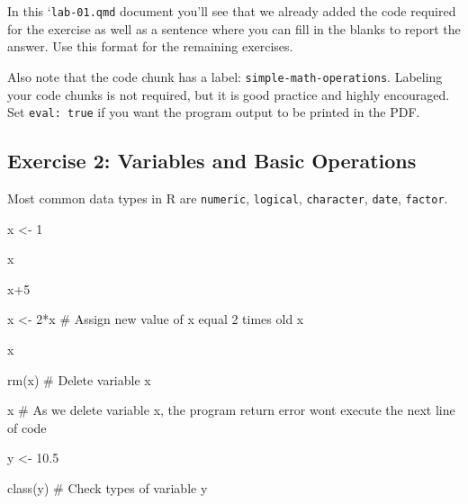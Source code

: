 \documentclass[
  letterpaper,
  DIV=11,
  numbers=noendperiod]{scrartcl}
\newenvironment{Shaded}{\begin{snugshade}}{\end{snugshade}}
\newcommand{\CommentTok}[1]{\textcolor[rgb]{0.37,0.37,0.37}{#1}}
\newcommand{\DecValTok}[1]{\textcolor[rgb]{0.68,0.00,0.00}{#1}}
\newcommand{\FloatTok}[1]{\textcolor[rgb]{0.68,0.00,0.00}{#1}}
\newcommand{\FunctionTok}[1]{\textcolor[rgb]{0.28,0.35,0.67}{#1}}
\newcommand{\NormalTok}[1]{\textcolor[rgb]{0.00,0.23,0.31}{#1}}
\newcommand{\OtherTok}[1]{\textcolor[rgb]{0.00,0.23,0.31}{#1}}
\newcommand{\SpecialCharTok}[1]{\textcolor[rgb]{0.37,0.37,0.37}{#1}}
\begin{document}
\begin{tcolorbox}[enhanced jigsaw, leftrule=.75mm, colback=white, toptitle=1mm, bottomtitle=1mm, colbacktitle=quarto-callout-note-color!10!white, titlerule=0mm, bottomrule=.15mm, breakable, rightrule=.15mm, left=2mm, title=\textcolor{quarto-callout-note-color}{\faInfo}\hspace{0.5em}{Note}, toprule=.15mm, opacityback=0, opacitybacktitle=0.6, arc=.35mm, coltitle=black, colframe=quarto-callout-note-color-frame]

In this `\texttt{lab-01.qmd\textasciigrave{}} document you'll see that
we already added the code required for the exercise as well as a
sentence where you can fill in the blanks to report the answer. Use this
format for the remaining exercises.

Also note that the code chunk has a label:
\texttt{simple-math-operations}. Labeling your code chunks is not
required, but it is good practice and highly encouraged. Set
\texttt{eval:\ true} if you want the program output to be printed in the
PDF.

\end{tcolorbox}

\subsection{Exercise 2: Variables and Basic
Operations}\label{exercise-2-variables-and-basic-operations}

Most common data types in R are \texttt{numeric}, \texttt{logical},
\texttt{character}, \texttt{date}, \texttt{factor}.

\begin{Shaded}
\begin{Highlighting}[]
\NormalTok{x }\OtherTok{\textless{}{-}} \DecValTok{1}

\NormalTok{x}

\NormalTok{x}\SpecialCharTok{+}\DecValTok{5}

\NormalTok{x }\OtherTok{\textless{}{-}} \DecValTok{2}\SpecialCharTok{*}\NormalTok{x }\CommentTok{\# Assign new value of x equal 2 times old x}

\NormalTok{x}

\FunctionTok{rm}\NormalTok{(x) }\CommentTok{\# Delete variable x}

\NormalTok{x }\CommentTok{\# As we delete variable x, the program return error won\textquotesingle{}t execute the next line of code}

\NormalTok{y }\OtherTok{\textless{}{-}} \FloatTok{10.5}

\FunctionTok{class}\NormalTok{(y) }\CommentTok{\# Check types of variable y}
\end{Highlighting}
\end{Shaded}
\end{document}
